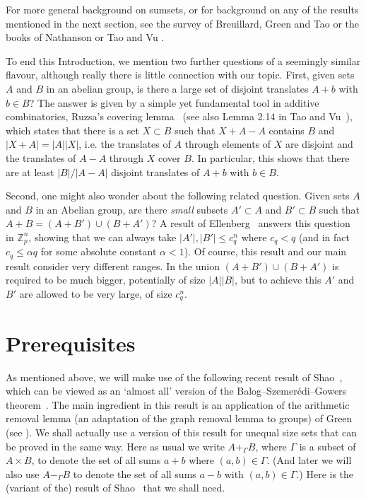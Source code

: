 \documentclass[12pt,reqno]{amsart}
\theoremstyle{definition}
\renewcommand\leq{\leqslant}
\begin{document}
\vspace{5pt}
For more general background on sumsets, or for background on any of the results
mentioned in the next section, see the survey of Breuillard, Green and Tao \cite{BGT-doubling} or the
books of Nathanson \cite{Nathbook} or Tao and Vu \cite{taobook}.

\vspace{5pt}
To end this Introduction, we mention two further questions of a seemingly similar flavour,
although really there is little connection with our topic.
First, given sets $A$ and $B$ in an abelian group, is there a large set
of disjoint translates $A+b$ with $b \in B$? The answer is given by a simple
yet fundamental tool in additive combinatorics, Ruzsa's covering lemma~\cite{RuzsaCov}
(see also Lemma 2.14 in Tao and Vu~\cite{taobook}), which states that there is a set $X\subset B$
such that $X+A-A$ contains $B$ and $|X+A|=|A||X|$, i.e. the translates of $A$ through
elements of $X$ are disjoint and the translates of $A-A$ through $X$ cover $B$. In
particular, this shows that there are at least $|B|/|A-A|$ disjoint
translates of $A+b$ with $b \in B$.

\vspace{5pt}
Second, one might also wonder about the following related question. Given sets $A$
and $B$ in an Abelian group, are there {\em small} subsets $A'\subset A$ and
$B'\subset B$ such that $A+B=(A+B') \cup (B+A')$? A result of Ellenberg~\cite{Ell} answers
this question in ${\mathbb Z}_p^n$, showing that we can always take $|A'|, |B'| \leq c_q^n$
where $c_q<q$ (and in fact $c_q \leq \alpha q$ for some absolute constant $\alpha<1$).  Of course, this result and our main result consider very
different ranges. In \cite{Ell} the union $(A+B') \cup (B+A')$ is required to be much
bigger, potentially of size $|A||B|$, but to achieve this $A'$ and $B'$ are allowed to be very large, of
size $c_q^n$.

\vspace{5pt}
\section{Prerequisites}
As mentioned above, we will make use of
the following recent result of Shao~\cite{shao}, which can be viewed as an `almost all'
version of the Balog--Szemer\'edi--Gowers theorem~\cite{BSG1,BSG2}. The main ingredient
in this result is an application of the arithmetic removal lemma (an adaptation
of the graph removal lemma to groups) of
Green (see \cite{green}). We shall actually use a version of this result for unequal size sets
that can be proved in the same way. Here as usual we write $A+_{\Gamma}B$, where $\Gamma$ is a subset
of $A \times B$, to denote the set of all sums $a+b$ where $(a,b) \in \Gamma$. (And later we will also
use $A-_{\Gamma}B$ to denote the set of all sums $a-b$ with $(a,b) \in \Gamma$.) Here is the (variant of the)
result of Shao~\cite{shao} that we shall need.
\end{document}
